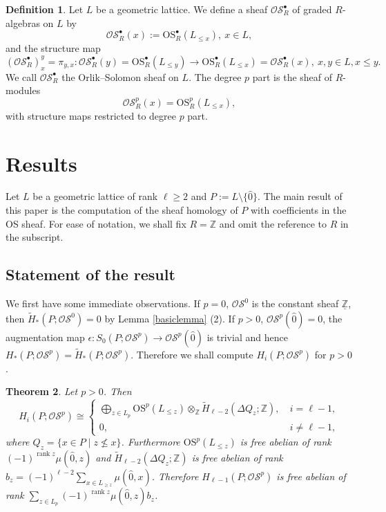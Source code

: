 \documentclass{amsart}
\numberwithin{equation}{section}
\newtheorem{thm}{Theorem}[section]
\theoremstyle{plain}
\theoremstyle{remark}
\theoremstyle{definition}
\newtheorem{defn}[thm]{Definition}
\numberwithin{equation}{section}
\newcommand{\Z}{\mathbb{Z}}
\newcommand{\OS}{\mathrm{OS}}
\newcommand{\sOS}{\mathscr{OS}}
\DeclareMathOperator{\rank}{rank}
\begin{document}
\begin{defn}
    Let $L$ be a geometric lattice. We define a sheaf $\sOS_R^{\bullet}$ of graded $R$-algebras on $L$ by
    \[
    \sOS_R^{\bullet}(x):=\OS_R^\bullet(L_{\leq x}), ~x\in L,
    \]
    and the structure map
    \[
    (\sOS_R^\bullet)^y_x=\pi_{y,x}: \sOS_R^\bullet(y)=\OS_R^\bullet(L_{\leq y})\to\OS_R^\bullet(L_{\leq x})=\sOS_R^\bullet(x), ~x,y\in L, x\leq y.
    \]
    We call $\sOS_R^\bullet$ the Orlik--Solomon sheaf on $L$. The degree $p$ part is the sheaf of $R$-modules
    \[
    \sOS_R^p(x)=\OS_R^p(L_{\leq x}),
    \]
    with structure maps restricted to degree $p$ part.
\end{defn}


\section{Results}
Let $L$ be a geometric lattice of rank $\ell\geq 2$ and $P:=L\setminus\{\hat{0}\}$. The main result of this paper is the computation of the sheaf homology of $P$ with coefficients in the OS sheaf. For ease of notation, we shall fix $R=\Z$ and omit the reference to $R$ in the subscript.


\subsection{Statement of the result}


We first have some immediate observations. 
If $p=0$, $\sOS^0$ is the constant sheaf $\underline{\Z}$, then $\widetilde{H}_*(P;\sOS^0)=0$ by Lemma \ref{basiclemma} (2). 
If $p>0$, $\sOS^p(\hat{0})=0$, the augmentation map $\epsilon: S_0(P;\sOS^p)\to \sOS^p(\hat{0})$ is trivial and hence $H_*(P;\sOS^p)=\widetilde{H}_*(P;\sOS^p)$. 
Therefore we shall compute $H_i(P;\sOS^p)$ for $p>0$.

\begin{thm}\label{main}
    Let $p>0$. Then
    \[
    H_i(P;\sOS^p)\cong \begin{cases}
        \bigoplus_{z\in L_p}\OS^p(L_{\leq z})\otimes_{\Z}\widetilde{H}_{\ell-2}(\Delta Q_z;\Z),~&i=\ell-1,\\
        0,& i\neq \ell-1,
    \end{cases}
    \]
    where $Q_z=\{x\in P\mid z\not\leq x\}$. Furthermore $\OS^p(L_{\leq z})$ is free abelian of rank $(-1)^{\rank z}\mu(\hat{0},z)$ and $\widetilde{H}_{\ell-2}(\Delta Q_z;\Z)$ is free abelian of rank $b_z=(-1)^{\ell-2}\sum_{x\in L_{\geq z}}\mu(\hat{0},x)$. Therefore $H_{\ell-1}(P;\sOS^p)$ is free abelian of rank $\sum_{z\in L_p}(-1)^{\rank z}\mu(\hat{0},z)b_z$.
\end{thm}
\end{document}
